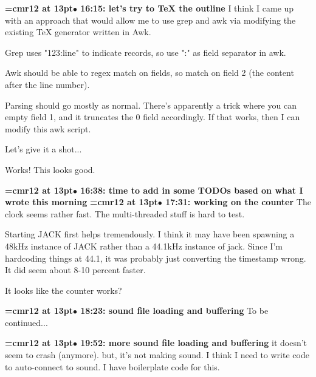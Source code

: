 {\smallskip\noindent\bf\font\titlefont=cmr12 at 13pt\titlefont $\bullet$ 16:15: let's try to TeX the outline}\smallskip
I think I came up with an approach that would allow me to use grep and awk via modifying the existing TeX generator written in Awk.
\par

Grep uses "123:line" to indicate records, so use ":" as field separator in awk.
\par

Awk should be able to regex match on fields, so match on field 2 (the content after the line number).
\par

Parsing should go mostly as normal. There's apparently a trick where you can empty field 1, and it truncates the 0 field accordingly. If that works, then I can modify this awk script.
\par

Let's give it a shot...
\par

Works! This looks good.
\par

{\smallskip\noindent\bf\font\titlefont=cmr12 at 13pt\titlefont $\bullet$ 16:38: time to add in some TODOs based on what I wrote this morning}\smallskip
{\smallskip\noindent\bf\font\titlefont=cmr12 at 13pt\titlefont $\bullet$ 17:31: working on the counter}\smallskip
The clock seems rather fast. The multi-threaded stuff is hard to test.
\par

Starting JACK first helps tremendously. I think it may have been spawning a 48kHz instance of JACK rather than a 44.1kHz instance of jack. Since I'm hardcoding things at 44.1, it was probably just converting the timestamp wrong. It did seem about 8-10 percent faster.
\par

It looks like the counter works?
\par

{\smallskip\noindent\bf\font\titlefont=cmr12 at 13pt\titlefont $\bullet$ 18:23: sound file loading and buffering}\smallskip
To be continued...
\par

{\smallskip\noindent\bf\font\titlefont=cmr12 at 13pt\titlefont $\bullet$ 19:52: more sound file loading and buffering}\smallskip
it doesn't seem to crash (anymore). but, it's not making sound. I think I need to write code to auto-connect to sound. I have boilerplate code for this.
\par

